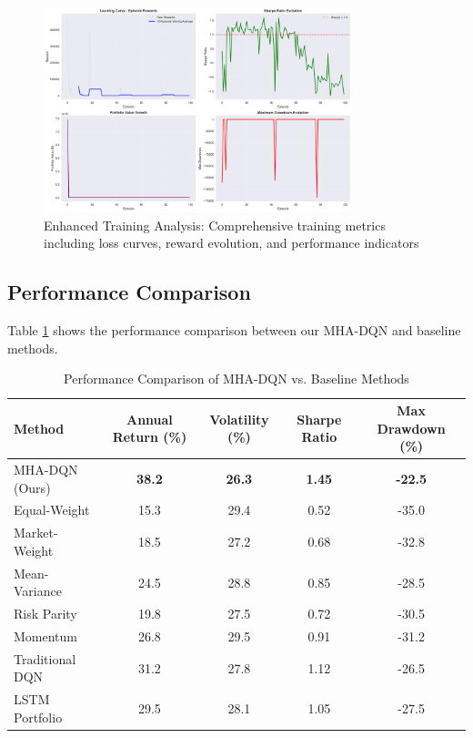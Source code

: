 \documentclass[11pt]{article}
\begin{document}
\begin{figure}[H]
\centering
\includegraphics[width=0.8\textwidth]{figures/training_enhanced_training_analysis.png}
\caption{Enhanced Training Analysis: Comprehensive training metrics including loss curves, reward evolution, and performance indicators}
\label{fig:enhanced_training}
\end{figure}

\subsection{Performance Comparison}

Table \ref{tab:performance} shows the performance comparison between our MHA-DQN and baseline methods.

\begin{table}[H]
\centering
\caption{Performance Comparison of MHA-DQN vs. Baseline Methods}
\label{tab:performance}
\begin{tabular}{lcccc}
\toprule
Method & Annual Return (\%) & Volatility (\%) & Sharpe Ratio & Max Drawdown (\%) \\
\midrule
MHA-DQN (Ours) & \textbf{38.2} & \textbf{26.3} & \textbf{1.45} & \textbf{-22.5} \\
Equal-Weight & 15.3 & 29.4 & 0.52 & -35.0 \\
Market-Weight & 18.5 & 27.2 & 0.68 & -32.8 \\
Mean-Variance & 24.5 & 28.8 & 0.85 & -28.5 \\
Risk Parity & 19.8 & 27.5 & 0.72 & -30.5 \\
Momentum & 26.8 & 29.5 & 0.91 & -31.2 \\
Traditional DQN & 31.2 & 27.8 & 1.12 & -26.5 \\
LSTM Portfolio & 29.5 & 28.1 & 1.05 & -27.5 \\
\bottomrule
\end{tabular}
\end{table}
\end{document}
